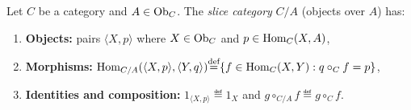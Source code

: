 \documentclass[10pt,a4paper]{article}
\begin{document}
\begin{definition}\label{def:slice_cat}
Let $C$ be a category and $A \in {\textrm{Ob}}_C$. The \emph{slice category} $C / A$ (objects over $A$) has:
\begin{enumerate}
\item \textbf{Objects:} pairs $\langle X, p \rangle$ where $X \in {\textrm{Ob}}_C$ and $p \in {\textrm{Hom}}_C(X, A)$,
\item \textbf{Morphisms:} ${\textrm{Hom}}_{C/A}(\langle X, p \rangle, \langle Y, q \rangle) {\stackrel{{\textrm{def}}}{=}} \{ f \in {\textrm{Hom}}_C(X, Y) : q \circ_C f = p \}$,
\item \textbf{Identities and composition:} $1_{\langle X, p \rangle} \eqdef 1_X$ and $g \circ_{C/A} f \eqdef g \circ_C f$.
\end{enumerate}
\end{definition}
\end{document}
